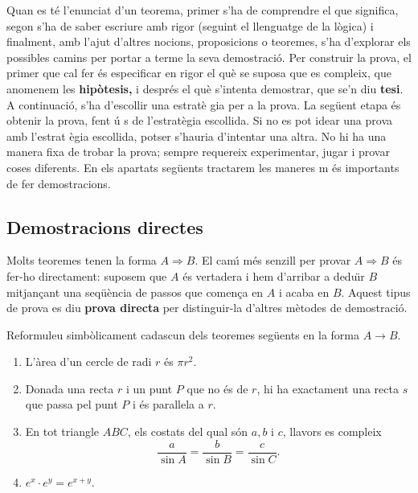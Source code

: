 Quan es t\'{e} l'enunciat d'un teorema, primer s'ha de comprendre el que
significa, segon s'ha de saber escriure amb rigor (seguint el llenguatge de
la l\`{o}gica) i finalment, amb l'ajut d'altres nocions, proposicions o
teoremes, s'ha d'explorar els possibles camins per portar a terme la seva
demostraci\'{o}. Per construir la prova, el primer que cal fer \'{e}s
especificar en rigor el qu\`{e} se suposa que es compleix, que anomenem les
\textbf{hip\`{o}tesis, }i despr\'{e}s el qu\`{e} s'intenta demostrar, que
se'n diu \textbf{tesi}. A continuaci\'{o}, s'ha d'escollir una estrat\`{e}%
gia per a la prova. La seg\"{u}ent etapa \'{e}s obtenir la prova, fent \'{u}%
s de l'estrat\`{e}gia escollida. Si no es pot idear una prova amb l'estrat%
\`{e}gia escollida, potser s'hauria d'intentar una altra. No hi ha una
manera fixa de trobar la prova; sempre requereix experimentar, jugar i
provar coses diferents. En els apartats seg\"{u}ents tractarem les maneres m%
\'{e}s importants de fer demostracions.

\subsection{Demostracions directes}

Molts teoremes tenen la forma $A\Longrightarrow B$. El cam\'{\i} m\'{e}s
senzill per provar $A\Longrightarrow B$ \'{e}s fer-ho directament: suposem
que $A$ \'{e}s vertadera i hem d'arribar a dedu\"{\i}r $B$ mitjan\c{c}ant
una seq\"{u}\`{e}ncia de passos que comen\c{c}a en $A$ i acaba en $B$.
Aquest tipus de prova es diu \textbf{prova directa} per distinguir-la
d'altres m\`{e}todes de demostraci\'{o}.

\begin{exemple}
Reformuleu simb\`{o}licament cadascun dels teoremes seg\"{u}ents en la forma
$A\longrightarrow B$.

\begin{enumerate}
\item L'\`{a}rea d'un cercle de radi $r$ \'{e}s $\pi r^{2}$.

\item Donada una recta $r$ i un punt $P$ que no \'{e}s de $r$, hi ha
exactament una recta $s$ que passa pel punt $P$ i \'{e}s
paral\textperiodcentered lela a $r$.

\item En tot triangle $ABC$, els costats del qual s\'{o}n $a,b$ i $c$,
llavors es compleix%
\begin{equation*}
\frac{a}{\sin A}=\frac{b}{\sin B}=\frac{c}{\sin C}\text{.}
\end{equation*}

\item $e^{x}\cdot e^{y}=e^{x+y}$.
\end{enumerate}
\end{exemple}

